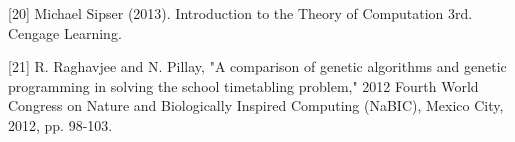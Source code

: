 \begin{Titemize}
		\Titem \label{20}[20]  Michael Sipser (2013). Introduction to the Theory of Computation 3rd. Cengage Learning.
		
		\Titem \label{21}[21] R. Raghavjee and N. Pillay, "A comparison of genetic algorithms and genetic programming in solving the school timetabling problem," 2012 Fourth World Congress on Nature and Biologically Inspired Computing (NaBIC), Mexico City, 2012, pp. 98-103.	
\end{Titemize}
